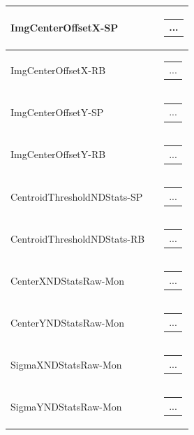 \documentclass[openany]{article}
\begin{document}
\begin{longtable}{| m{3.0cm} m{4.5cm} m{7.0cm} |}
        ImgCenterOffsetX-SP &  & \begin{tabular}{@{}m{6cm}@{}}
                ...
            \end{tabular} \\ \hline
        ImgCenterOffsetX-RB &  & \begin{tabular}{@{}m{6cm}@{}}
                ...
            \end{tabular} \hypertarget{}{}\\ \hline
        ImgCenterOffsetY-SP &  & \begin{tabular}{@{}m{6cm}@{}}
                ...
            \end{tabular} \\ \hline
        ImgCenterOffsetY-RB &  & \begin{tabular}{@{}m{6cm}@{}}
                ...
            \end{tabular} \hypertarget{}{}\\ \hline
        CentroidThresholdNDStats-SP &  & \begin{tabular}{@{}m{6cm}@{}}
                ...
            \end{tabular} \\ \hline
        CentroidThresholdNDStats-RB &  & \begin{tabular}{@{}m{6cm}@{}}
                ...
            \end{tabular} \hypertarget{}{}\\ \hline
        CenterXNDStatsRaw-Mon &  & \begin{tabular}{@{}m{6cm}@{}}
                ...
            \end{tabular} \hypertarget{}{}\\ \hline
        CenterYNDStatsRaw-Mon &  & \begin{tabular}{@{}m{6cm}@{}}
                ...
            \end{tabular} \hypertarget{}{}\\ \hline
        SigmaXNDStatsRaw-Mon &  & \begin{tabular}{@{}m{6cm}@{}}
                ...
            \end{tabular} \hypertarget{}{}\\ \hline
        SigmaYNDStatsRaw-Mon &  & \begin{tabular}{@{}m{6cm}@{}}
                ...

\end{tabular}
\end{longtable}
\end{document}

